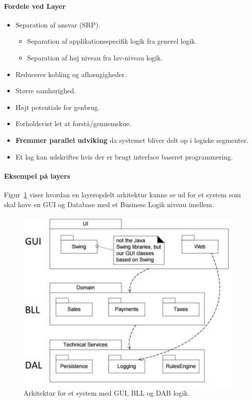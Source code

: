 \paragraph{Fordele ved Layer}
\begin{itemize}
	\item Separation af ansvar (SRP).
	\begin{itemize}
		\item Separation af applikationsspecifik logik fra generel logik.
		\item Separation af høj niveau fra lav-niveau logik.
	\end{itemize}
	\item Reducerer kobling og afhængigheder.
	\item Større samhørighed.
	\item Højt potentiale for genbrug.
	\item Forholdsvist let at forstå/gennemskue.
	\item \textbf{Fremmer parallel udviking} da systemet bliver delt op i logiske segmenter.
	\item Et lag kan udskriftes hvis der er brugt interface baseret programmering.
\end{itemize}

\paragraph{Eksempel på layers}
Figur~\ref{fig:guiblldab} viser hvordan en layeropdelt arkitektur kunne se ud for et system som skal have en GUI og Database med et Business Logik niveau imellem.

\begin{figure}[h]
	\centering
	\includegraphics[width=0.7\linewidth]{figs/guiblldal}
	\caption{Arkitektur for et system med GUI, BLL og DAB logik.}
	\label{fig:guiblldab}
\end{figure}

